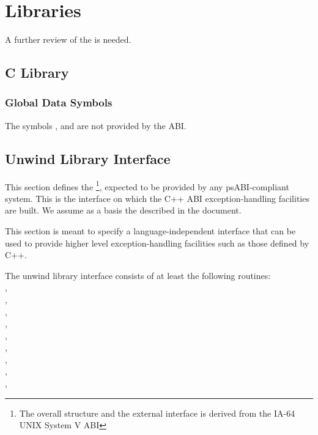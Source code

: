 \chapter{Libraries}

A further review of the \intelabi is needed.

\section{C Library}

\subsection{Global Data Symbols}

The symbols ,  and 
are not provided by the \xARCH ABI.

\section{Unwind Library Interface}

This section defines the %
\footnote{The overall structure and the external interface is derived
from the IA-64 UNIX System V ABI},
expected to be provided by any \xARCH psABI-compliant system.
This is the interface on which the C++ ABI exception-handling
facilities are built. We assume as a basis the
 described in the
 document.

This section is meant to specify a language-independent interface that
can be used to provide higher level exception-handling facilities such
as those defined by C++.

The unwind library interface consists of at least the following routines:\\
,\\
,\\
,\\
,\\
,\\
,\\
,\\
,\\
,\\

